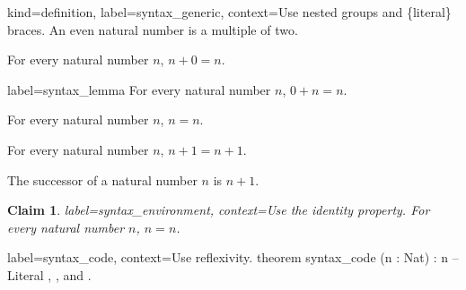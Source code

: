 \documentclass{article}
\newtheorem{claim}{Claim}
\begin{document}
\lea%
{kind=definition,
 label=syntax_generic,
 context={Use {nested} groups and \{literal\} braces.}
}%
{An even natural number is a multiple of two.}

\leatheorem{
 label=syntax_theorem,
 context={Use elementary arithmetic.}%
}%
{For every natural number $n$, $n+0=n$.}

\lealemma
{label=syntax_lemma}%
{For every natural number $n$, $0+n=n$.}

{For every natural number $n$, $n=n$.}

{For every natural number $n$, $n+1=n+1$.}

{The successor of a natural number $n$ is $n+1$.}

\begin{claim}\label{clm:syntax}
\leatheorem
{
 label=syntax_environment,
 context={Use the identity property.}
}
For every natural number $n$, $n=n$.
\end{claim}

\begin{leacode}%
{
 label=syntax_code,
 context={Use reflexivity.}
}
theorem syntax_code (n : Nat) : n %
-- Literal , \label{not_a_label}, and { }.
\end{leacode}
\end{document}
